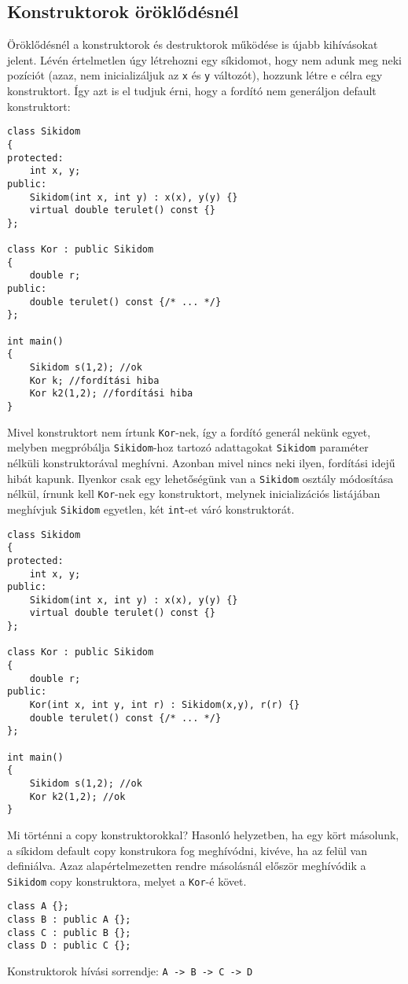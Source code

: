 \documentclass[a4paper,11.5pt,table]{article}
\begin{document}
	\subsection{Konstruktorok öröklődésnél}
	Öröklődésnél a konstruktorok és destruktorok működése is újabb kihívásokat jelent. Lévén értelmetlen úgy létrehozni egy síkidomot, hogy nem adunk meg neki pozíciót (azaz, nem inicializáljuk az \texttt{x} és \texttt{y} változót), hozzunk létre e célra egy konstruktort. Így azt is el tudjuk érni, hogy a fordító nem generáljon default konstruktort:
	\begin{lstlisting}
class Sikidom
{
protected:
	int x, y;
public:
	Sikidom(int x, int y) : x(x), y(y) {}
	virtual double terulet() const {}
};

class Kor : public Sikidom
{
	double r;
public:
	double terulet() const {/* ... */}
};

int main()
{
	Sikidom s(1,2); //ok
	Kor k; //fordítási hiba
	Kor k2(1,2); //fordítási hiba
}
	\end{lstlisting}
	Mivel konstruktort nem írtunk \texttt{Kor}-nek, így a fordító generál nekünk egyet, melyben megpróbálja \texttt{Sikidom}-hoz tartozó adattagokat \texttt{Sikidom} paraméter nélküli konstruktorával meghívni. Azonban mivel nincs neki ilyen, fordítási idejű hibát kapunk. Ilyenkor csak egy lehetőségünk van a \texttt{Sikidom} osztály módosítása nélkül, írnunk kell \texttt{Kor}-nek egy konstruktort, melynek inicializációs listájában meghívjuk \texttt{Sikidom} egyetlen, két \texttt{int}-et váró konstruktorát.
\begin{lstlisting}
class Sikidom
{
protected:
	int x, y;
public:
	Sikidom(int x, int y) : x(x), y(y) {}
	virtual double terulet() const {}
};

class Kor : public Sikidom
{
	double r;
public:
	Kor(int x, int y, int r) : Sikidom(x,y), r(r) {}
	double terulet() const {/* ... */}
};

int main()
{
	Sikidom s(1,2); //ok
	Kor k2(1,2); //ok
}
\end{lstlisting}
	Mi történni a copy konstruktorokkal? Hasonló helyzetben, ha egy kört másolunk, a síkidom default copy konstrukora fog meghívódni, kivéve, ha az felül van definiálva. Azaz alapértelmezetten rendre másolásnál először meghívódik a \texttt{Sikidom} copy konstruktora, melyet a \texttt{Kor}-é követ.
	
	\begin{lstlisting}
class A {};
class B : public A {};
class C : public B {};
class D : public C {};
	\end{lstlisting}
	Konstruktorok hívási sorrendje: \texttt{A -> B -> C -> D}
	
\end{document}
